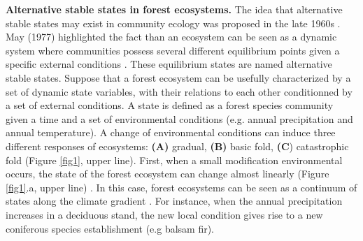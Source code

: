 \textbf{Alternative stable states in forest ecosystems.} The idea that
alternative stable states may exist in community ecology was proposed in the late
1960s \cite{Scheffer2001,Society2014a}. May (1977) highlighted the fact than an
ecosystem can be seen as a dynamic system where communities possess several
different equilibrium points given a specific external conditions
\cite{May1977}. 
These equilibrium states are named alternative stable states.
Suppose that a forest ecosystem can be usefully characterized by a set of
dynamic state variables, with their relations to each other conditionned by a set
of external conditions.
A state is defined as a forest
species community given a time and a set of environmental conditions (e.g.
annual precipitation and annual temperature). 
A change of
environmental conditions can induce three different responses of ecosystems: \textbf{(A)} gradual, \textbf{(B)} basic fold, \textbf{(C})
catastrophic fold  \cite{Scheffer2001} (Figure \ref{fig1}, upper line).
First, when a small modification environmental occurs, the state of the forest ecosystem can
change almost linearly (Figure \ref{fig1}.a, upper line)
\cite{Scheffer2001,Scheffer2009}. In this case, forest ecosystems can be seen
as a continuum of states along the climate gradient
\cite{Scheffer2001,Scheffer2009,scheffer2009critical}. For instance, when the
annual precipitation increases  in a deciduous stand, the new local
condition gives rise to a new coniferous species establishment (e.g balsam
fir). 
